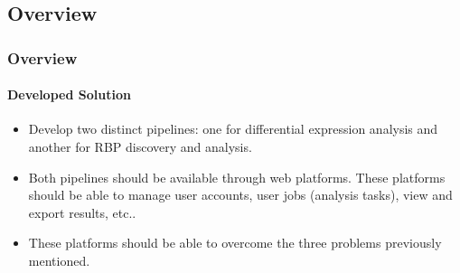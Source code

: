 \documentclass[xcolor=dvipsnames]{beamer}
\begin{document}
\subsection{Overview}
\begin{frame}
  \frametitle{Overview}
  \framesubtitle{Developed Solution}

\begin{itemize}

\item
Develop two distinct pipelines: one for differential expression analysis and
another for RBP discovery and analysis.\\ \vspace{0.8cm}

\item
Both pipelines should be available through web platforms. These platforms should
be able to manage user accounts, user jobs (analysis tasks), view and export
results, etc..\\ \vspace{0.8cm}

\item
These platforms should be able to overcome the three problems previously
mentioned.




\end{itemize}


\end{frame}
\end{document}
